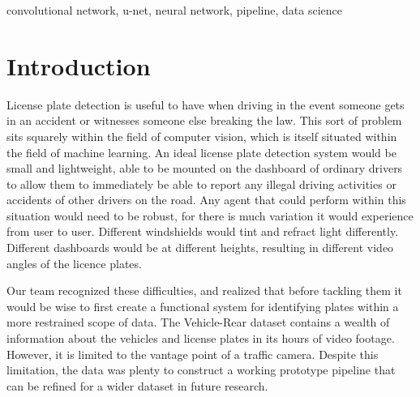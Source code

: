 \documentclass[conference]{IEEEtran}
\begin{document}
\begin{IEEEkeywords}
convolutional network, u-net, neural network, pipeline, data science
\end{IEEEkeywords}

\section{Introduction}
License plate detection is useful to have when driving in the event someone gets in an accident or witnesses someone else breaking the law. This sort of problem sits squarely within the field of computer vision, which is itself situated within the field of machine learning. An ideal license plate detection system would be small and lightweight, able to be mounted on the dashboard of ordinary drivers to allow them to immediately be able to report any illegal driving activities or accidents of other drivers on the road. Any agent that could perform within this situation would need to be robust, for there is much variation it would experience from user to user. Different windshields would tint and refract light differently. Different dashboards would be at different heights, resulting in different video angles of the licence plates. 
\par
Our team recognized these difficulties, and realized that before tackling them it would be wise to first create a functional system for identifying plates within a more restrained scope of data. The Vehicle-Rear dataset contains a wealth of information about the vehicles and license plates in its hours of video footage. However, it is limited to the vantage point of a traffic camera. Despite this limitation, the data  was plenty to construct a working prototype  pipeline that can be refined for a wider dataset in future research. 
\end{document}
